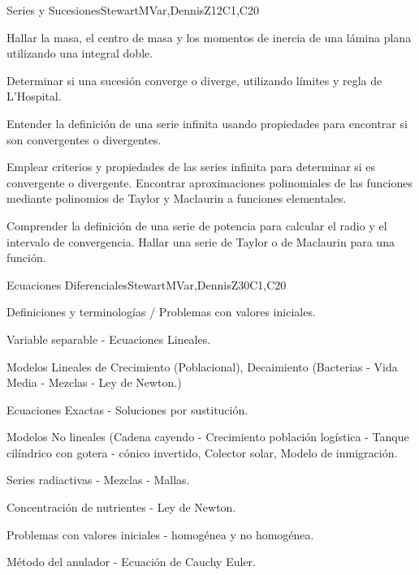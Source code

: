\begin{syllabus}
\begin{unit}{Series y Sucesiones}{}{StewartMVar,DennisZ}{12}{C1,C20}
  \begin{learningoutcomes}
    \item Hallar la masa, el centro de masa y los momentos de inercia de una lámina plana utilizando una integral doble.
    \item Determinar si una sucesión converge o diverge, utilizando límites y regla de L'Hospital.
    \item Entender la definición de una serie infinita usando propiedades para encontrar si son convergentes o divergentes.
    \item Emplear criterios y propiedades de las series infinita para determinar si es convergente o divergente. Encontrar aproximaciones polinomiales de las funciones mediante polinomios de Taylor y Maclaurin a funciones elementales.
    \item Comprender la definición de una serie de potencia para calcular el radio y el intervalo de convergencia. Hallar una serie de Taylor o de Maclaurin para una función.
    \end{learningoutcomes}
\end{unit}

\begin{unit}{Ecuaciones Diferenciales}{}{StewartMVar,DennisZ}{30}{C1,C20}
  \begin{topics}
    \item Definiciones y terminologías / Problemas con valores iniciales.
    \item Variable separable - Ecuaciones Lineales.
    \item Modelos Lineales de Crecimiento (Poblacional), Decaimiento (Bacterias - Vida Media - Mezclas - Ley de Newton.)
    \item Ecuaciones Exactas - Soluciones por sustitución.
    \item Modelos No lineales (Cadena cayendo - Crecimiento población logística - Tanque cilíndrico con gotera - cónico invertido, Colector solar, Modelo de inmigración.
    \item Series radiactivas - Mezclas - Mallas.
    \item Concentración de nutrientes - Ley de Newton.
    \item Problemas con valores iniciales - homogénea y no homogénea.
    \item Método del anulador - Ecuación de Cauchy Euler.
   \end{topics}
  

\end{unit}
\end{syllabus}
